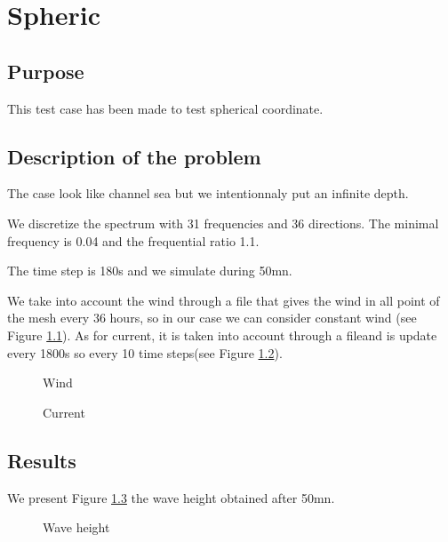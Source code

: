 \chapter{Spheric}
%
%
\section{Purpose}
%
This test case has been made to test spherical coordinate. 

\section{Description of the problem}

The case look like channel sea but we intentionnaly put an infinite depth. 

We discretize the spectrum with 31 frequencies and 36 directions. The minimal frequency is 0.04 and the frequential ratio 1.1.

The time step is 180s and we simulate during 50mn. 

We take into account the wind through a file that gives the wind in all point of the mesh every 36 hours, so in our case we can consider constant wind (see Figure \ref{figSphericVent}). As for current, it is taken into account through a fileand is update every 1800s so every 10 time steps(see Figure \ref{figSphericCourrant}).
\begin{figure} [!h]
\centering
{}
 \caption{Wind}
\label{figSphericVent}
\end{figure}
\begin{figure} [!h]
\centering
{}
 \caption{Current}
\label{figSphericCourrant}
\end{figure}

\section{Results}
We present Figure \ref{figSphericHm0} the wave height obtained after 50mn. 
\begin{figure} [!h]
\centering
{}
 \caption{Wave height}
\label{figSphericHm0}
\end{figure}
